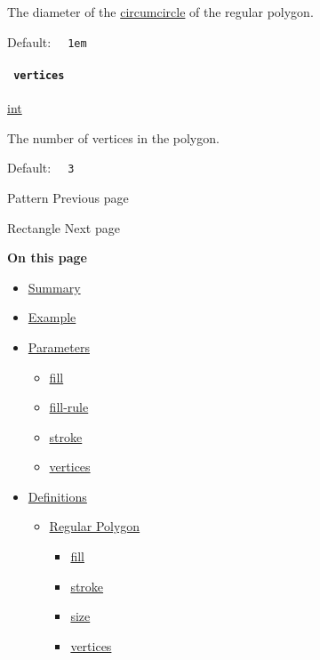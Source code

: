 The diameter of the
\href{https://en.wikipedia.org/wiki/Circumcircle}{circumcircle} of the
regular polygon.

Default: \texttt{\ }{\texttt{\ 1em\ }}\texttt{\ }

\paragraph{\texorpdfstring{\texttt{\ vertices\ }}{ vertices }}\label{definitions-regular-vertices}

\href{/docs/reference/foundations/int/}{int}

The number of vertices in the polygon.

Default: \texttt{\ }{\texttt{\ 3\ }}\texttt{\ }

\href{/docs/reference/visualize/pattern/}{\pandocbounded{}}

{ Pattern } { Previous page }

\href{/docs/reference/visualize/rect/}{\pandocbounded{}}

{ Rectangle } { Next page }

\textbf{On this page}

\begin{itemize}
\tightlist
\item
  \hyperref[summary]{Summary}
\item
  \hyperref[example]{Example}
\item
  \hyperref[parameters]{Parameters}

  \begin{itemize}
  \tightlist
  \item
    \hyperref[parameters-fill]{fill}
  \item
    \hyperref[parameters-fill-rule]{fill-rule}
  \item
    \hyperref[parameters-stroke]{stroke}
  \item
    \hyperref[parameters-vertices]{vertices}
  \end{itemize}
\item
  \hyperref[definitions]{Definitions}

  \begin{itemize}
  \tightlist
  \item
    \hyperref[definitions-regular]{Regular Polygon}

    \begin{itemize}
    \tightlist
    \item
      \hyperref[definitions-regular-fill]{fill}
    \item
      \hyperref[definitions-regular-stroke]{stroke}
    \item
      \hyperref[definitions-regular-size]{size}
    \item
      \hyperref[definitions-regular-vertices]{vertices}
    \end{itemize}
  \end{itemize}
\end{itemize}

